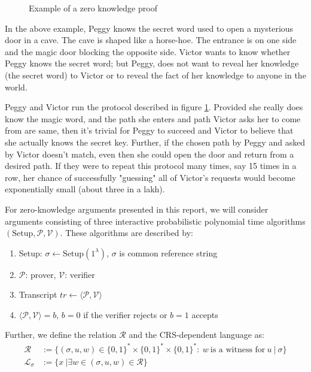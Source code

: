 \begin{figure}[h!]
    \caption{Example of a zero knowledge proof}
    \label{fig:zkp_alibaba}
    \end{figure}
    
In the above example, Peggy knows the secret word used to open a mysterious door in a cave. The cave is shaped like a horse-hoe. The entrance is on one side and the magic door blocking the opposite side. Victor wants to know whether Peggy knows the secret word; but Peggy, does not want to reveal her knowledge (the secret word) to Victor or to reveal the fact of her knowledge to anyone in the world. 

Peggy and Victor run the protocol described in figure \ref{fig:zkp_alibaba}. Provided she really does know the magic word, and the path she enters and path Victor asks her to come from are same, then it's trivial for Peggy to succeed and Victor to believe that she actually knows the secret key. Further, if the chosen path by Peggy and asked by Victor doesn't match, even then she could open the door and return from a desired path. If they were to repeat this protocol many times, say 15 times in a row, her chance of successfully "guessing" all of Victor's requests would become exponentially small (about three in a lakh).

For zero-knowledge arguments presented in this report, we will consider arguments consisting of three interactive probabilistic polynomial time algorithms $(\text{Setup}, \mathcal{P}, \mathcal{V})$. These algorithms are described by:
\begin{enumerate}
    \item Setup: $\sigma \leftarrow \text{Setup}(1^{\lambda})$, $\sigma$ is common reference string
    \item $\mathcal{P}$: prover, $\mathcal{V}$: verifier
    \item Transcript $tr \leftarrow \langle \mathcal{P}, \mathcal{V} \rangle$
    \item $\langle \mathcal{P}, \mathcal{V} \rangle = b$, $b=0$ if the verifier rejects or $b=1$ accepts 
\end{enumerate}

Further, we define the relation $\mathcal{R}$ and the CRS-dependent language as:
\begin{align*}
    \mathcal{R} &:= \{ (\sigma, u, w) \in \{0,1\}^{\ast} \times  \{0,1\}^{\ast} \times  \{0,1\}^{\ast}: \ w \ \text{is a witness for}\ u \ | \ \sigma \}\\
    \mathcal{L}_{\sigma} &:=  \{ x \ | \exists w \in (\sigma, u, w) \in \mathcal{R} \}
\end{align*}

